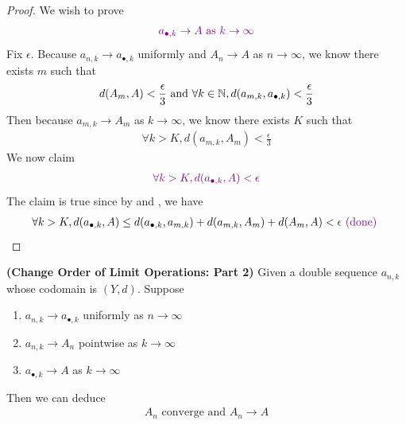 \documentclass{report}
\begin{document}
\begin{proof}
We wish to prove 
\begin{align*}
\textcolor{violet}{a_{\bullet,k}\to A\text{ as }k\to \infty}
\end{align*}
Fix $\epsilon $. Because $a_{n,k}\to a_{\bullet,k}$ uniformly and $A_n\to A$ as $n\to \infty$, we know there exists $m$ such that 
 \begin{align}
  \label{K1}
d(A_m,A)<\frac{\epsilon}{3}\text{ and }\forall k\in\mathbb{N},d(a_{m,k},a_{\bullet,k})<\frac{\epsilon}{3}
\end{align}
Then because $a_{m,k}\to A_m$ as $k\to \infty$, we know there exists $K$ such that
\begin{align}
\label{K2}
\forall k>K, d(a_{m,k},A_m)<\frac{\epsilon}{3}
\end{align}
We now claim 
\begin{align*}
  \textcolor{violet}{\forall k>K, d(a_{\bullet,k},A)<\epsilon}
\end{align*}
The claim is true since by  and , we have 
\begin{align*}
  \forall k>K, d(a_{\bullet,k},A)\leq d(a_{\bullet,k},a_{m,k})+d(a_{m,k},A_m)+d(A_m,A)<\epsilon \textcolor{violet}{\text{ (done) }}
\end{align*}
\end{proof}
\begin{theorem}
\label{COLO2}
\textbf{(Change Order of Limit Operations: Part 2)} Given a double sequence $a_{n,k}$ whose codomain is $(Y,d)$. Suppose 

\begin{enumerate}[label=(\alph*)]
  \item $a_{n,k}\to a_{\bullet,k}$ uniformly as $n\to \infty$ 
  \item $a_{n,k}\to A_n$ pointwise as $k\to \infty$ 
  \item $a_{\bullet,k}\to A$ as $k\to \infty$
\end{enumerate}
Then we can deduce
\begin{align*}
A_n\text{ converge and  }A_n \to A
\end{align*}
\end{theorem}
\end{document}
